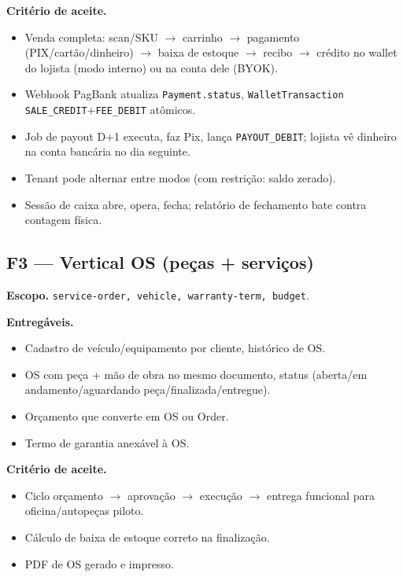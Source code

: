 \documentclass[11pt,a4paper]{article}
\begin{document}
\textbf{Critério de aceite.}
\begin{itemize}[leftmargin=2em]
  \item Venda completa: scan/SKU $\to$ carrinho $\to$ pagamento
        (PIX/cartão/dinheiro) $\to$ baixa de estoque $\to$ recibo $\to$
        crédito no wallet do lojista (modo interno) ou na conta dele
        (BYOK).
  \item Webhook PagBank atualiza \texttt{Payment.status},
        \texttt{WalletTransaction} \texttt{SALE\_CREDIT}+\texttt{FEE\_DEBIT}
        atômicos.
  \item Job de payout D+1 executa, faz Pix, lança \texttt{PAYOUT\_DEBIT};
        lojista vê dinheiro na conta bancária no dia seguinte.
  \item Tenant pode alternar entre modos (com restrição: saldo zerado).
  \item Sessão de caixa abre, opera, fecha; relatório de fechamento bate
        contra contagem física.
\end{itemize}

\subsection{F3 --- Vertical OS (peças + serviços)}

\textbf{Escopo.} \texttt{service-order, vehicle, warranty-term, budget}.

\textbf{Entregáveis.}
\begin{itemize}[leftmargin=2em]
  \item Cadastro de veículo/equipamento por cliente, histórico de OS.
  \item OS com peça + mão de obra no mesmo documento, status
        (aberta/em andamento/aguardando peça/finalizada/entregue).
  \item Orçamento que converte em OS ou Order.
  \item Termo de garantia anexável à OS.
\end{itemize}

\textbf{Critério de aceite.}
\begin{itemize}[leftmargin=2em]
  \item Ciclo orçamento $\to$ aprovação $\to$ execução $\to$ entrega
        funcional para oficina/autopeças piloto.
  \item Cálculo de baixa de estoque correto na finalização.
  \item PDF de OS gerado e impresso.
\end{itemize}
\end{document}
